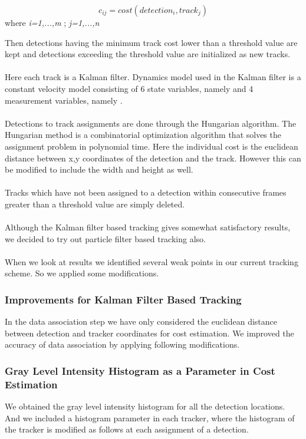 \documentclass[12pt,a4paper]{report}
\begin{document}
\begin{equation}
 c_{ij}= cost(detection_i, track_j) \end{equation} 
where \textit{i=1,...,m} ; \textit{j=1,...,n}


Then detections having the minimum track cost lower than a threshold value are kept and detections exceeding the threshold value are initialized as new tracks. \\\\
Here each track is a Kalman filter. Dynamics model used in the Kalman filter is a constant velocity model consisting of 6 state variables, namely  and 4 measurement variables, namely  .\\\\
Detections to track assignments are done through the Hungarian algorithm. The Hungarian method is a combinatorial optimization algorithm that solves the assignment problem in polynomial time. Here the individual cost is the euclidean distance between x,y coordinates of the detection and the track. However this can be modified to include the width and height as well.\\\\
Tracks which have not been assigned to a detection within consecutive frames greater than a threshold value are simply deleted. \\\\
Although the Kalman filter based tracking gives somewhat satisfactory results, we decided to try out particle filter based tracking also.\\\\
When we look at results we identified several weak points in our current tracking scheme. So we applied some modifications.

\subsubsection{Improvements for Kalman Filter Based Tracking}
In the data association step we have only considered the euclidean distance between detection and tracker coordinates for cost estimation. We improved the accuracy of data association by applying following modifications.

\subsubsection{Gray Level Intensity Histogram as a Parameter in Cost Estimation}
We obtained the gray level intensity histogram for all the detection locations. And we included a histogram parameter in each tracker, where the histogram of the tracker is modified as follows at each assignment of a detection.
\end{document}
